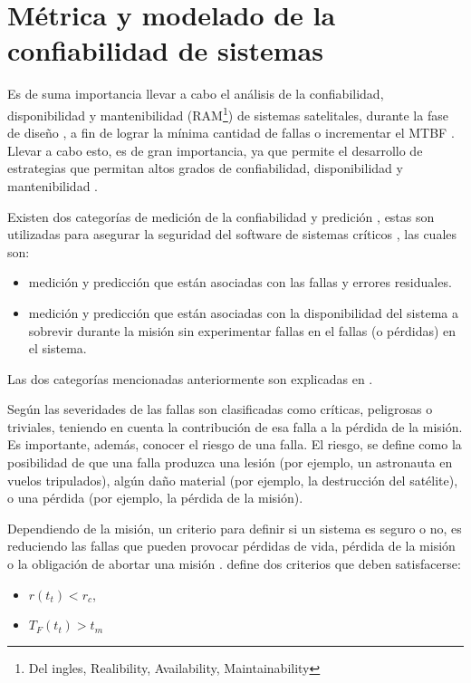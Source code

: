 \section{Métrica y modelado de la confiabilidad de sistemas}
Es de suma importancia llevar a cabo el análisis de la confiabilidad, disponibilidad y mantenibilidad (RAM\footnote{Del ingles, Realibility, Availability, Maintainability}) de sistemas satelitales, durante la fase de diseño \citep{Hoque15}, a fin de lograr la mínima cantidad de fallas o incrementar el \ac{MTBF} \citep{Peng13}. Llevar a cabo esto, es de gran importancia, ya que permite el desarrollo de estrategias que permitan altos grados de confiabilidad, disponibilidad y mantenibilidad \citep{Hoque15}.

Existen dos categorías de medición de la confiabilidad y predición \citep{Schneidewind97}, estas son utilizadas para asegurar la seguridad del software de sistemas críticos \citep{Schneidewind97}, las cuales son:
  \begin{itemize}
    \item medición y predicción que están asociadas con las fallas y errores residuales.
    \item medición y predicción que están asociadas con la disponibilidad del sistema a sobrevir durante la misión sin experimentar fallas en el fallas (o pérdidas) en el sistema.
  \end{itemize}

  Las dos categorías mencionadas anteriormente son explicadas en \cite{Schneidewind97}.

  Según \cite{Liu14} las severidades de las fallas son clasificadas como críticas, peligrosas o triviales, teniendo en cuenta la contribución de esa falla a la pérdida de la misión. Es importante, además, conocer el riesgo de una falla. El riesgo, se define como la posibilidad de que una falla produzca una lesión (por ejemplo, un astronauta en vuelos tripulados), algún daño material (por ejemplo, la destrucción del satélite), o una pérdida (por ejemplo, la pérdida de la misión).

  Dependiendo de la misión, un criterio para definir si un sistema es seguro o no, es reduciendo las fallas que pueden provocar pérdidas de vida, pérdida de la misión o la obligación de abortar una misión \citep{Schneidewind97}. \cite{Schneidewind97} define dos criterios que deben satisfacerse:
  \begin{itemize}
    \item $r(t_t) < r_c$,
    \item $T_F(t_t) > t_m$
  \end{itemize}

